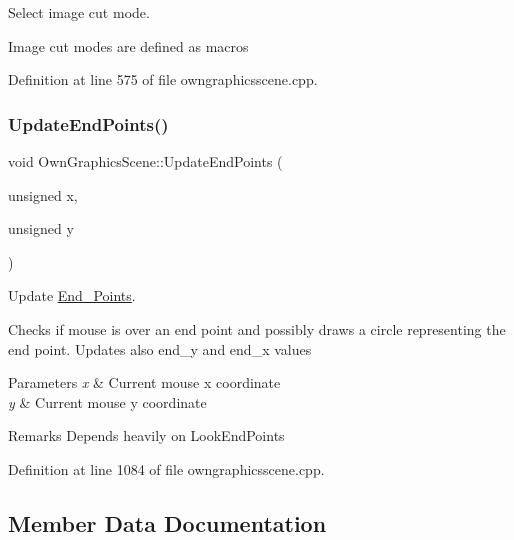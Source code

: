 Select image cut mode. 

Image cut modes are defined as macros 

Definition at line 575 of file owngraphicsscene.\+cpp.

\mbox{\label{classOwnGraphicsScene_adf8d1495517483ba65c1ccbc95920a1c}} 
\subsubsection{\texorpdfstring{Update\+End\+Points()}{UpdateEndPoints()}}
{\footnotesize\ttfamily void Own\+Graphics\+Scene\+::\+Update\+End\+Points (\begin{DoxyParamCaption}\item[{unsigned}]{x,  }\item[{unsigned}]{y }\end{DoxyParamCaption})}



Update \mbox{\hyperlink{structEnd__Points}{End\+\_\+\+Points}}. 

Checks if mouse is over an end point and possibly draws a circle representing the end point. Updates also end\+\_\+y and end\+\_\+x values 
\begin{DoxyParams}{Parameters}
{\em x} & Current mouse x coordinate \\
\hline
{\em y} & Current mouse y coordinate \\
\hline
\end{DoxyParams}
\begin{DoxyRemark}{Remarks}
Depends heavily on Look\+End\+Points 
\end{DoxyRemark}


Definition at line 1084 of file owngraphicsscene.\+cpp.



\subsection{Member Data Documentation}
\mbox{\label{classOwnGraphicsScene_a511dd73ffc0a5f3ee28e8950d0636f5e}} 
